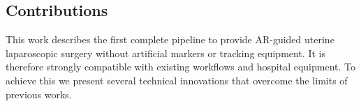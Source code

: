 
\subsection{Contributions}
\label{sec:contributions}
This work describes the first complete pipeline to provide AR-guided uterine laparoscopic surgery without artificial markers or tracking equipment. It is therefore strongly compatible with existing workflows and hospital equipment. To achieve this we present several technical innovations that overcome the limits of previous works.%

